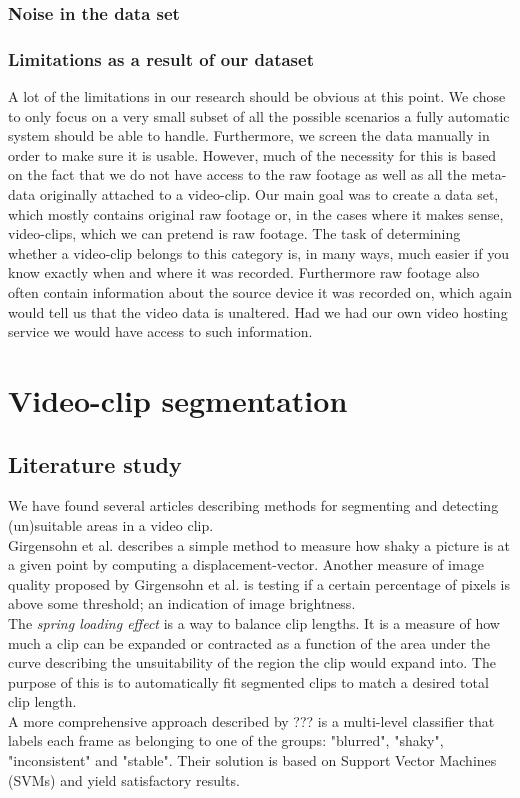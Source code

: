 \documentclass[12pt]{article}
\begin{document}
\subsubsection{Noise in the data set}
%
%
\subsubsection{Limitations as a result of our dataset}
%
A lot of the limitations in our research should be obvious at this point. We chose to only focus on a very small subset of all the possible scenarios a fully automatic system should be able to handle. Furthermore, we screen the data manually in order to make sure it is usable. However, much of the necessity for this is based on the fact that we do not have access to the raw footage as well as all the meta-data originally attached to a video-clip. Our main goal was to create a data set, which mostly contains original raw footage or, in the cases where it makes sense, video-clips, which we can pretend is raw footage. The task of determining whether a video-clip belongs to this category is, in many ways, much easier if you know exactly when and where it was recorded. Furthermore raw footage also often contain information about the source device it was recorded on, which again would tell us that the video data is unaltered. Had we had our own video hosting service we would have access to such information.
%
\section{Video-clip segmentation}
%
%
\subsection{Literature study}
We have found several articles describing methods for segmenting and detecting (un)suitable areas in a video clip.\\
Girgensohn et al. \cite{Girgensohn:2000:SAH:354401.354415} describes a simple method to measure how shaky a picture is at a given point by computing a displacement-vector. Another measure of image quality proposed by Girgensohn et al. is testing if a certain percentage of pixels is above some threshold; an indication of image brightness.\\
The \textit{spring loading effect}\cite{Girgensohn:2000:SAH:354401.354415} is a way to balance clip lengths. It is a measure of how much a clip can be expanded or contracted as a function of the area under the curve describing the unsuitability of the region the clip would expand into. The purpose of this is to automatically fit segmented clips to match a desired total clip length.\\
%
A more comprehensive approach described by ??? \cite{10.1109/ICME.2005.1521399} is a multi-level classifier that labels each frame as belonging to one of the groups: "blurred", "shaky", "inconsistent" and "stable". Their solution is based on Support Vector Machines (SVMs) and yield satisfactory results.
%
\end{document}
